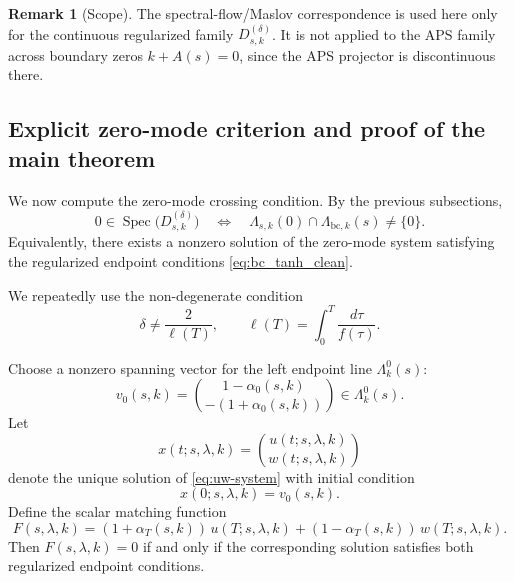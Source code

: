 \documentclass[11pt]{article}
\theoremstyle{definition}
\newtheorem{remark}[remark]{Remark}
\DeclareMathOperator{\Spec}{Spec}
\numberwithin{equation}{section}
\begin{document}
\begin{remark}[Scope]
\label{rem:scope-maslov-regularized-only}
The spectral-flow/Maslov correspondence is used here only for the continuous regularized family \(D^{(\delta)}_{s,k}\). It is not applied to the APS family across boundary zeros \(k+A(s)=0\), since the APS projector is discontinuous there.
\end{remark}

\subsection{Explicit zero-mode criterion and proof of the main theorem}\label{subsec:matching_clean}

We now compute the zero-mode crossing condition. By the previous subsections,
\begin{equation}
0\in\Spec\bigl(D^{(\delta)}_{s,k}\bigr)
\quad\Longleftrightarrow\quad
\Lambda_{s,k}(0)\cap\Lambda_{\mathrm{bc},k}(s)\neq\{0\}.
\end{equation}
Equivalently, there exists a nonzero solution of the zero-mode system satisfying the regularized endpoint conditions \eqref{eq:bc_tanh_clean}.

We repeatedly use the non-degenerate condition
\begin{equation}\label{eq:non-degenerate-delta}
\delta \neq \frac{2}{\ell(T)},
\qquad
\ell(T)=\int_0^T \frac{d\tau}{f(\tau)}.
\end{equation}

Choose a nonzero spanning vector for the left endpoint line \(\Lambda_k^0(s)\):
\begin{equation}
v_0(s,k)=\binom{1-\alpha_0(s,k)}{-(1+\alpha_0(s,k))}\in\Lambda_k^0(s).
\end{equation}
Let
\begin{equation}
x(t;s,\lambda,k)=\binom{u(t;s,\lambda,k)}{w(t;s,\lambda,k)}
\end{equation}
denote the unique solution of \eqref{eq:uw-system} with initial condition
\begin{equation}
x(0;s,\lambda,k)=v_0(s,k).
\end{equation}
Define the scalar matching function
\begin{equation}\label{eq:F_matching_clean}
F(s,\lambda,k)=
(1+\alpha_T(s,k))\,u(T;s,\lambda,k)
+
(1-\alpha_T(s,k))\,w(T;s,\lambda,k).
\end{equation}
Then \(F(s,\lambda,k)=0\) if and only if the corresponding solution satisfies both regularized endpoint conditions.
\end{document}
